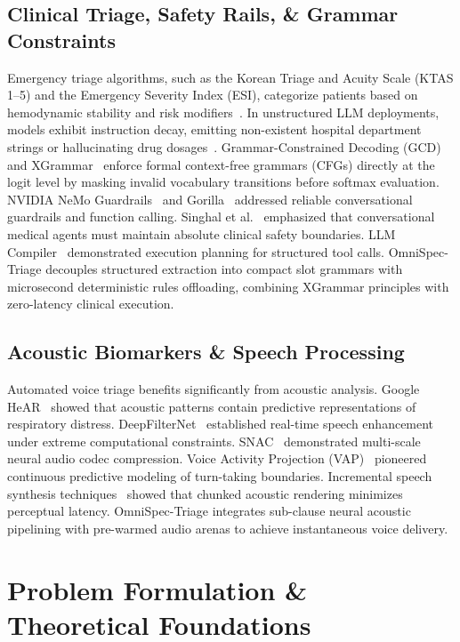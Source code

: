 \documentclass[10pt,journal,compsoc]{IEEEtran}
\begin{document}
\subsection{Clinical Triage, Safety Rails, \& Grammar Constraints}
Emergency triage algorithms, such as the Korean Triage and Acuity Scale (KTAS 1--5) and the Emergency Severity Index (ESI), categorize patients based on hemodynamic stability and risk modifiers~\cite{menon2024xai}. In unstructured LLM deployments, models exhibit instruction decay, emitting non-existent hospital department strings or
hallucinating drug dosages~\cite{singhal2023medpalm2}. Grammar-Constrained Decoding (GCD)~\cite{geng2023gcd} and XGrammar~\cite{xgrammar2025} enforce formal context-free grammars (CFGs) directly at the logit level by masking invalid vocabulary transitions before softmax evaluation. NVIDIA NeMo Guardrails~\cite{nemoguardrails2023} and
Gorilla~\cite{gorilla2023} addressed reliable conversational guardrails and function calling. Singhal et al.~\cite{singhal2023medpalm2} emphasized that conversational medical agents must maintain absolute clinical safety boundaries. LLM Compiler~\cite{llmcompiler2024} demonstrated execution planning for structured tool calls. OmniSpec-
Triage decouples structured extraction into compact slot grammars with microsecond deterministic rules offloading, combining XGrammar principles with zero-latency clinical execution.

\subsection{Acoustic Biomarkers \& Speech Processing}
Automated voice triage benefits significantly from acoustic analysis. Google HeAR~\cite{hear2024} showed that acoustic patterns contain predictive representations of respiratory distress. DeepFilterNet~\cite{deepfilternet2023} established real-time speech enhancement under extreme computational constraints. SNAC~\cite{snac2024}
demonstrated multi-scale neural audio codec compression. Voice Activity Projection (VAP)~\cite{vap2022} pioneered continuous predictive modeling of turn-taking boundaries. Incremental speech synthesis techniques~\cite{nvidiaincremental2022} showed that chunked acoustic rendering minimizes perceptual latency. OmniSpec-Triage integrates
sub-clause neural acoustic pipelining with pre-warmed audio arenas to achieve instantaneous voice delivery.

\section{Problem Formulation \& Theoretical Foundations}
\label{sec:formulation}
\end{document}

